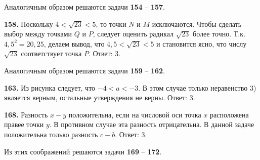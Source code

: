 Аналогичным  образом решаются задачи  \textbf{154} – \textbf{157}.

\textbf{158.}  Поскольку $4<\sqrt{23}<5$, то точки $N$  и $M$ исключаются. Чтобы сделать выбор между точками $Q$ и $P$, следует оценить радикал $\sqrt{23}$ более точно. Т.к. $4,5^2=20,25$, делаем вывод, что $4,5<\sqrt{23}<5$ и становится ясно, что числу $\sqrt{23}$ соответствует точка  $P$. \newline \null \hspace*{\fill} Ответ: 3.

Аналогичным  образом решаются задачи  \textbf{159} – \textbf{162}.

\textbf{163.} Из рисунка следует, что $-4<a<-3$. В этом случае только неравенство 3) является верным, остальные утверждения не верны. \newline \null \hspace*{\fill} Ответ: 3. 

\textbf{168.} Разность $x-y$ положительна, если на числовой оси точка $x$ расположена  правее точки $y$. В противном случае эта разность отрицательна. В данной задаче  положительна только разность $c-b$. \newline \null \hspace*{\fill} Ответ: 3.

Из этих соображений решаются задачи  \textbf{169} – \textbf{172}.
